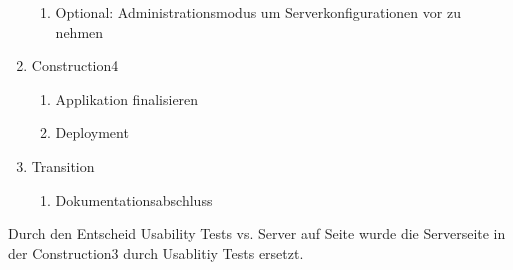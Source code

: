 \begin{enumerate}
\begin{enumerate}
    \item Optional: Administrationsmodus um Serverkonfigurationen vor zu nehmen
  \end{enumerate}
      \item Construction4
  \begin{enumerate}
    \item Applikation finalisieren
    \item Deployment
  \end{enumerate}
  \item Transition
  \begin{enumerate}
    \item Dokumentationsabschluss
  \end{enumerate}
\end{enumerate}

Durch den Entscheid Usability Tests vs. Server auf Seite \pageref{UsabilityEntscheid} wurde die Serverseite in der Construction3 durch Usablitiy Tests ersetzt.
\newpage






